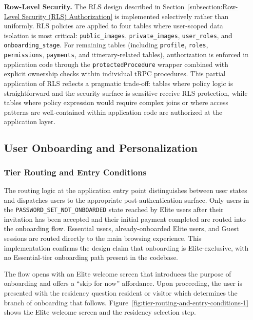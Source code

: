 \textbf{Row-Level Security.} The RLS design described in Section~\ref{subsection:Row-Level Security (RLS) Authorization} is implemented selectively rather than uniformly. RLS policies are applied to four tables where user-scoped data isolation is most critical: \texttt{public\_images}, \texttt{private\_images}, \texttt{user\_roles}, and \texttt{onboarding\_stage}. For remaining tables (including \texttt{profile}, \texttt{roles}, \texttt{permissions}, \texttt{payments}, and itinerary-related tables), authorization is enforced in application code through the \texttt{protectedProcedure} wrapper combined with explicit ownership checks within individual tRPC procedures. This partial application of RLS reflects a pragmatic trade-off: tables where policy logic is straightforward and the security surface is sensitive receive RLS protection, while tables where policy expression would require complex joins or where access patterns are well-contained within application code are authorized at the application layer.

\subsection{User Onboarding and Personalization}
\label{subsection:User Onboarding and Personalization}
\subsubsection{Tier Routing and Entry Conditions}
The routing logic at the application entry point distinguishes between user states and dispatches users to the appropriate post-authentication surface. Only users in the \texttt{PASSWORD\_SET\_NOT\_ONBOARDED} state reached by Elite users after their invitation has been accepted and their initial payment completed are routed into the onboarding flow. Essential users, already-onboarded Elite users, and Guest sessions are routed directly to the main browsing experience. This implementation confirms the design claim that onboarding is Elite-exclusive, with no Essential-tier onboarding path present in the codebase.

The flow opens with an Elite welcome screen that introduces the purpose of onboarding and offers a ``skip for now'' affordance. Upon proceeding, the user is presented with the residency question resident or visitor which determines the branch of onboarding that follows. Figure~\ref{fig:tier-routing-and-entry-conditions-1} shows the Elite welcome screen and the residency selection step.

